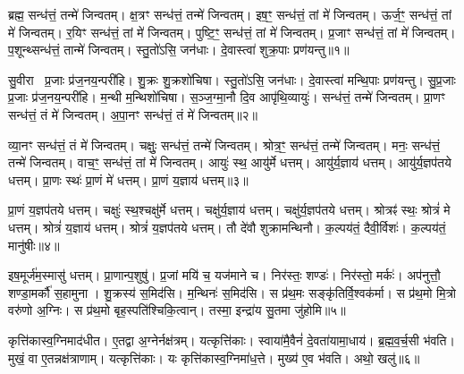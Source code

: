 \setcounter{anuvakam}{0}

ब्रह्म॒ सन्ध॑त्तं॒ तन्मे॑ जिन्वतम्।
क्ष॒त्रꣳ सन्ध॑त्तं॒ तन्मे॑ जिन्वतम्।
इष॒ꣳ॒ सन्ध॑त्तं॒ तां मे॑ जिन्वतम्।
ऊर्ज॒ꣳ॒ सन्ध॑त्तं॒ तां मे॑ जिन्वतम्।
र॒यिꣳ सन्ध॑त्तं॒ तां मे॑ जिन्वतम्।
पुष्टि॒ꣳ॒ सन्ध॑त्तं॒ तां मे॑ जिन्वतम्।
प्र॒जाꣳ सन्ध॑त्तं॒ तां मे॑ जिन्वतम्।
प॒शून्थ्सन्ध॑त्तं॒ तान्मे॑ जिन्वतम्।
स्तु॒तो॑ऽसि॒ जन॑धाः।
दे॒वास्त्वा॑ शुक्र॒पाः प्रण॑यन्तु॥१॥

सु॒वीरा प्र॒जाः प्र॑ज॒नय॒न्परी॑हि।
शु॒क्रः शु॒क्रशो॑चिषा।
स्तु॒तो॑ऽसि॒ जन॑धाः।
दे॒वास्त्वा॑ मन्थि॒पाः प्रण॑यन्तु।
सु॒प्र॒जाः प्र॒जाः प्र॑ज॒नय॒न्परी॑हि।
म॒न्थी म॒न्थिशो॑चिषा।
स॒ञ्ज॒ग्मा॒नौ दि॒व आपृ॑थि॒व्यायुः॑।
सन्ध॑त्तं॒ तन्मे॑ जिन्वतम्।
प्रा॒णꣳ सन्ध॑त्तं॒ तं मे॑ जिन्वतम्।
अ॒पा॒नꣳ सन्ध॑त्तं॒ तं मे॑ जिन्वतम्॥२॥

व्या॒नꣳ सन्ध॑त्तं॒ तं मे॑ जिन्वतम्।
चक्षुः॒ सन्ध॑त्तं॒ तन्मे॑ जिन्वतम्।
श्रोत्र॒ꣳ॒ सन्ध॑त्तं॒ तन्मे॑ जिन्वतम्।
मनः॒ सन्ध॑त्तं॒ तन्मे॑ जिन्वतम्।
वाच॒ꣳ॒ सन्ध॑त्तं॒ तां मे॑ जिन्वतम्।
आयुः॑ स्थ॒ आयु॑र्मे धत्तम्।
आयु॑र्य॒ज्ञाय॑ धत्तम्।
आयु॑र्य॒ज्ञप॑तये धत्तम्।
प्रा॒णः स्थः॑ प्रा॒णं मे॑ धत्तम्।
प्रा॒णं य॒ज्ञाय॑ धत्तम्॥३॥

प्रा॒णं य॒ज्ञप॑तये धत्तम्।
चक्षुः॑ स्थ॒श्चक्षु॑र्मे धत्तम्।
चक्षु॑र्य॒ज्ञाय॑ धत्तम्।
चक्षु॑र्य॒ज्ञप॑तये धत्तम्।
श्रोत्रꣴ॑ स्थः॒ श्रोत्रं॑ मे धत्तम्।
श्रोत्रं॑ य॒ज्ञाय॑ धत्तम्।
श्रोत्रं॑ य॒ज्ञप॑तये धत्तम्।
तौ दे॑वौ शुक्रामन्थिनौ।
क॒ल्पय॑तं॒ दैवी॒र्विशः॑।
क॒ल्पय॑तं॒ मानु॑षीः॥४॥

इष॒मूर्ज॑म॒स्मासु॑ धत्तम्।
प्रा॒णान्प॒शुषु॑।
प्र॒जां मयि॑ च॒ यज॑माने च।
निर॑स्तः॒ शण्डः॑।
निर॑स्तो॒ मर्कः॑।
अप॑नुत्तौ॒ शण्डा॒मर्कौ॑ स॒हामुना।
शु॒क्रस्य॑ स॒मिद॑सि।
म॒न्थिनः॑ स॒मिद॑सि।
स प्र॑थ॒मः सङ्कृ॑तिर्वि॒श्वक॑र्मा।
स प्र॑थ॒मो मि॒त्रो वरु॑णो अ॒ग्निः।
स प्र॑थ॒मो बृह॒स्पति॑श्चिकि॒त्वान्।
तस्मा॒ इन्द्रा॑य सु॒तमा जु॑होमि॥५॥\anuvakamend[न॒य॒न्त्व॒पा॒नꣳ सन्ध॑त्तं॒ तं मे॑ जिन्वतं प्रा॒णं य॒ज्ञाय॑ धत्तं॒ मानु॑षीर॒ग्निर्द्वे च॑॥ (ब्रह्म॑ क्ष॒त्रं तदिष॒मूर्जꣳ॑ र॒यिं पुष्टिं॑ प्र॒जां तां प॒शून्तान्थ्सन्ध॑त्तं॒ तत्प्रा॒णम॑पा॒नं व्या॒नं तं चक्षुः॒ श्रोत्रं॒ मन॒स्तद्वाचं॒ ताम्।
इ॒षादि॒पञ्च॑के॒ वाचं॒ तां मे॑ प॒शून्थ्सन्ध॑त्तं॒ तान्मे प्रा॒णादि॒त्रित॑ये॒ तं मे॒\-ऽन्यत्र॒ तन्मे)]

कृत्ति॑कास्व॒ग्निमाद॑धीत।
ए॒तद्वा अ॒ग्नेर्नक्ष॑त्रम्।
यत्कृत्ति॑काः।
स्वाया॑मै॒वैनं॑ दे॒वता॑यामा॒धाय॑।
ब्र॒ह्म॒व॒र्च॒सी भ॑वति।
मुखं॒ वा ए॒तन्नक्ष॑त्राणाम्।
यत्कृत्ति॑काः।
यः कृत्ति॑कास्व॒ग्निमा॑ध॒त्ते।
मुख्य॑ ए॒व भ॑वति।
अथो॒ खलु॑॥६॥


